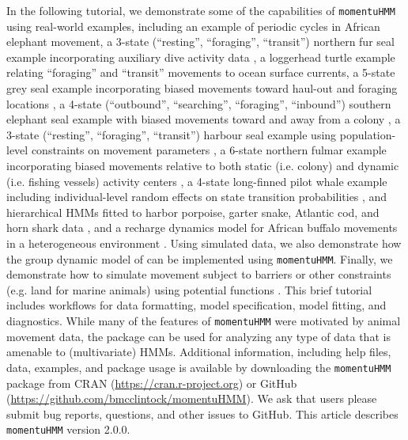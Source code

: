\documentclass[12pt]{article}\usepackage[]{graphicx}\usepackage[]{xcolor}
\begin{document}
In the following tutorial, we demonstrate some of the capabilities of \verb|momentuHMM| using real-world examples, including an example of periodic cycles in African elephant movement, a 3-state (``resting'', ``foraging'', ``transit'') northern fur seal example incorporating auxiliary dive activity data \citep{McClintockEtAl2014b}, a loggerhead turtle example relating ``foraging'' and ``transit'' movements to ocean surface currents, a 5-state grey seal example incorporating biased movements toward haul-out and foraging locations \citep{McClintockEtAl2012}, a 4-state (``outbound'', ``searching'', ``foraging'', ``inbound'') southern elephant seal example with biased movements toward and away from a colony \citep{MichelotEtAl2017}, a 3-state (``resting'', ``foraging'', ``transit'') harbour seal example using population-level constraints on movement parameters \citep{McClintockEtAl2013c}, a 6-state northern fulmar example incorporating biased movements relative to both static (i.e. colony) and dynamic (i.e. fishing vessels) activity centers \citep{PirottaEtAl2018}, a 4-state long-finned pilot whale example including individual-level random effects on state transition probabilities \citep{IsojunnoEtAl2017}, and hierarchical HMMs fitted to harbor porpoise, garter snake, Atlantic cod, and horn shark data \citep{Leos-BarajasEtAl2017,AdamEtAl2019}, and a recharge dynamics model for African buffalo movements in a heterogeneous environment \citep{HootenEtAl2019}. Using simulated data, we also demonstrate how the group dynamic model of \cite{LangrockEtAl2014} can be implemented using \verb|momentuHMM|. Finally, we demonstrate how to simulate movement subject to barriers or other constraints (e.g. land for marine animals) using potential functions \citep[e.g.][]{BrillingerEtAl2012}. This brief tutorial includes workflows for data formatting, model specification, model fitting, and diagnostics. While many of the features of \verb|momentuHMM| were motivated by animal movement data, the package can be used for analyzing any type of data that is amenable to (multivariate) HMMs.  Additional information, including help files, data, examples, and package usage is available by downloading the \verb|momentuHMM| package from CRAN (\url{https://cran.r-project.org}) or GitHub (\url{https://github.com/bmcclintock/momentuHMM}). We ask that users please submit bug reports, questions, and other issues to GitHub. This article describes \verb|momentuHMM| version 2.0.0.
\end{document}
